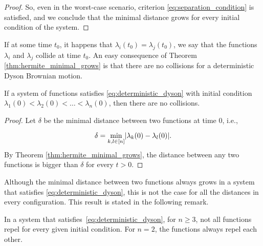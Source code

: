 \begin{proof}


    So, even in the worst-case scenario, criterion \eqref{eq:separation_condition} is satisfied, and we conclude that the minimal distance grows for every initial condition of the system.
\end{proof}


If at some time $t_0$, it happens that $\lambda_i(t_0) = \lambda_j(t_0)$, we say that the functions $\lambda_i$ and $\lambda_j$ collide at time $t_0$. An easy consequence of Theorem \ref{thm:hermite_minimal_grows} is that there are no collisions for a deterministic Dyson Brownian motion.

\begin{corollary}
    If a system of functions satisfies \eqref{eq:deterministic_dyson} with initial condition $\lambda_1(0) < \lambda_2(0) <\dots <\lambda_n(0)$, then there are no collisions.
\end{corollary}

\begin{proof}
    Let $\delta$ be the minimal distance between two functions at time $0$, i.e.,

    \begin{equation*}
        \delta = \min_{k,l\in [n]} \lvert  \lambda_k(0) - \lambda_l(0) \rvert.
    \end{equation*}
    By Theorem \ref{thm:hermite_minimal_grows}, the distance between any two functions is bigger than $\delta$ for every $t >0$.
\end{proof}


Although the minimal distance between two functions always grows in a system that satisfies \eqref{eq:deterministic_dyson}, this is not the case for all the distances in every configuration. This result is stated in the following remark.


\begin{remark} \label{remark:hermite_not_all_repel}
    In a system that satisfies~\eqref{eq:deterministic_dyson}, for $n\ge3$, not all functions repel for every given initial condition. For $n =2$, the functions always repel each other.
\end{remark}


